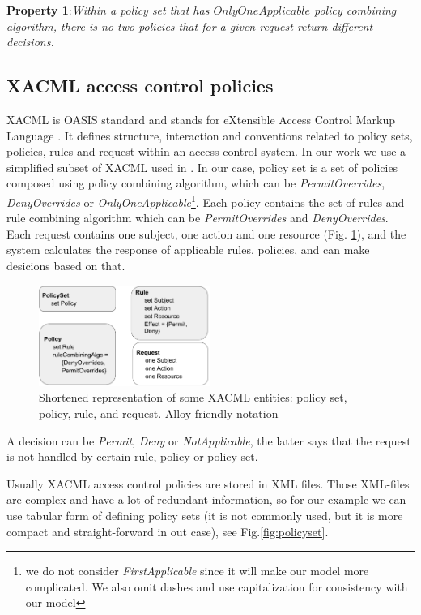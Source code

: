 \documentclass{acm_proc_article-sp}
\begin{document}
\textbf{Property 1}:\textit{Within a policy set that has $OnlyOneApplicable$ policy combining algorithm, there is no two policies that for a given request return different decisions.}

\subsection{XACML access control policies}

XACML is OASIS standard and stands for eXtensible Access Control Markup Language \cite{oasis:xacml}. It defines structure, interaction and conventions related to policy sets, policies, rules and request within an access control system. In our work we use a simplified subset of XACML used in \cite{acp:alloy}. In our case, policy set is a set of policies composed using policy combining algorithm, which can be \textit{PermitOverrides}, \textit{DenyOverrides} or \textit{OnlyOneApplicable}\footnote[1]{we do not consider \textit{FirstApplicable} since it will make our model more complicated. We also omit dashes and use capitalization for consistency with our model}. Each policy contains the set of rules and rule combining algorithm which can be \textit{PermitOverrides} and \textit{DenyOverrides}. Each request contains one subject, one action and one resource (Fig. \ref{fig:model}), and the system calculates the response of applicable rules, policies, and can make desicions based on that. 

\begin{figure}[h]
\includegraphics[width=0.5\textwidth]{model.png}
\caption{Shortened representation of some XACML entities: policy set, policy, rule, and request. Alloy-friendly notation}    
  \label{fig:model}
\end{figure}

A decision can be \textit{Permit}, \textit{Deny} or \textit{NotApplicable}, the latter says that the request is not handled by certain rule, policy or policy set. 

Usually XACML access control policies are stored in XML files. Those XML-files are complex and have a lot of redundant information, so for our example we can use tabular form of defining policy sets (it is not commonly used, but it is more compact and straight-forward in out case), see Fig.\ref{fig:policyset}.
\end{document}
